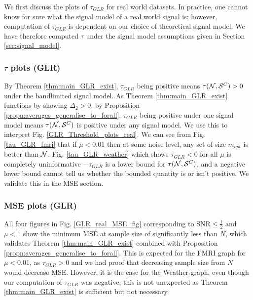 {We first discuss the plots of $\tau_{GLR}$ for real world datasets. In practice, one cannot know for sure what the signal model of a real world signal is; however, computation of $\tau_{GLR}$ is dependent on our choice of theoretical signal model. We have therefore computed $\tau$ under the signal model assumptions given in Section \ref{sec:signal_model}.  
}

\subsubsection{$\tau$ plots (GLR)}
By Theorem \ref{thm:main_GLR_exist}, $\tau_{GLR}$ being positive means $\tau(\mathcal{N},\mathcal{S}^{C}) >0$ under the bandlimited signal model. As Theorem \ref{thm:main_GLR_exist} functions by showing $\Delta_{2} >0$, by Proposition \ref{propn:averages_generalise_to_forall}, $\tau_{GLR}$ being positive under one signal model means $\tau(\mathcal{N},\mathcal{S}^{C})$ is positive under any signal model. We use this to interpret Fig. \ref{GLR_Threshold_plots_real}.
We can see from Fig. \ref{tau_GLR_fmri} that if $\mu<0.01$ then at some noise level, any set of size $m_{opt}$ is better than $\mathcal{N}$. Fig. \ref{tau_GLR_weather} which shows $\tau_{GLR} < 0$ for all $\mu$ is completely uninformative -- $\tau_{GLR}$ is a lower bound for $\tau(\mathcal{N},\mathcal{S}^{C})$, and a negative lower bound cannot tell us whether the bounded quantity is or isn't positive. We validate this in the MSE section.

\subsubsection{MSE plots (GLR)}
All four figures in Fig. \ref{GLR_real_MSE_fig} corresponding to $\text{SNR} \leq \frac{1}{2}$ and $\mu < 1$ show the minimum MSE at sample size of significantly less than $N$, which validates Theorem \ref{thm:main_GLR_exist} combined with Proposition \ref{propn:averages_generalise_to_forall}. This is expected for the FMRI graph for $\mu<0.01$, as $\tau_{GLR} > 0$ and we had proof that decreasing sample size from $N$ would decrease MSE. However, it is the case for the Weather graph, even though our computation of $\tau_{GLR}$ was negative; this is not unexpected as Theorem \ref{thm:main_GLR_exist} is sufficient but not necessary.

